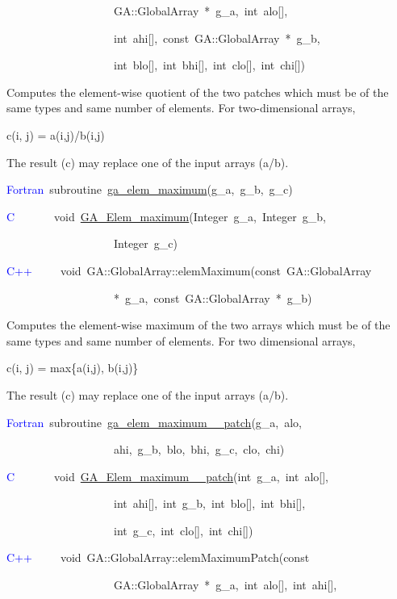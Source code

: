 ~~~~~~~~~~~~~~~~~~~GA::GlobalArray~{*}~g\_a,~int~alo{[}{]},~

~~~~~~~~~~~~~~~~~~~int~ahi{[}{]},~const~GA::GlobalArray~{*}~g\_b,~

~~~~~~~~~~~~~~~~~~~int~blo{[}{]},~int~bhi{[}{]},~int~clo{[}{]},~int~chi{[}{]})

Computes the element-wise quotient of the two patches which must be
of the same types and same number of elements. For two-dimensional
arrays,

c(i, j) = a(i,j)/b(i,j)

The result (c) may replace one of the input arrays (a/b). 

\textcolor{blue}{Fortran}~subroutine~\href{https://hpc.pnl.gov/globalarrays/api/f_op_api.html\#ga_elem_maximum}{ga\_{}elem\_{}maximum}(g\_a,~g\_b,~g\_c)~

\textcolor{blue}{C}~~~~~~~void~\href{https://hpc.pnl.gov/globalarrays/api/c_op_api.html\#ga_elem_maximum}{GA\_{}Elem\_{}maximum}(Integer~g\_a,~Integer~g\_b,~

~~~~~~~~~~~~~~~~~~~Integer~g\_c)

\textcolor{blue}{C++}~~~~~void~GA::GlobalArray::elemMaximum(const~GA::GlobalArray~

~~~~~~~~~~~~~~~~~~~{*}~g\_a,~const~GA::GlobalArray~{*}~g\_b)

Computes the element-wise maximum of the two arrays which must be
of the same types and same number of elements. For two dimensional
arrays,

c(i, j) = max\{a(i,j), b(i,j)\}

The result (c) may replace one of the input arrays (a/b). 

\textcolor{blue}{Fortran}~subroutine~\href{https://hpc.pnl.gov/globalarrays/api/f_op_api.html\#ga_elem_maximum_patch}{ga\_{}elem\_{}maximum\_{}\_{}patch}(g\_a,~alo,

~~~~~~~~~~~~~~~~~~~ahi,~g\_b,~blo,~bhi,~g\_c,~clo,~chi)~

\textcolor{blue}{C}~~~~~~~void~\href{https://hpc.pnl.gov/globalarrays/api/c_op_api.html\#ga_elem_maximum_patch}{GA\_{}Elem\_{}maximum\_{}\_{}patch}(int~g\_a,~int~alo{[}{]},

~~~~~~~~~~~~~~~~~~~int~ahi{[}{]},~int~g\_b,~int~blo{[}{]},~int~bhi{[}{]},~

~~~~~~~~~~~~~~~~~~~int~g\_c,~int~clo{[}{]},~int~chi{[}{]})

\textcolor{blue}{C++}~~~~~void~GA::GlobalArray::elemMaximumPatch(const~

~~~~~~~~~~~~~~~~~~~GA::GlobalArray~{*}~g\_a,~int~alo{[}{]},~int~ahi{[}{]},~


